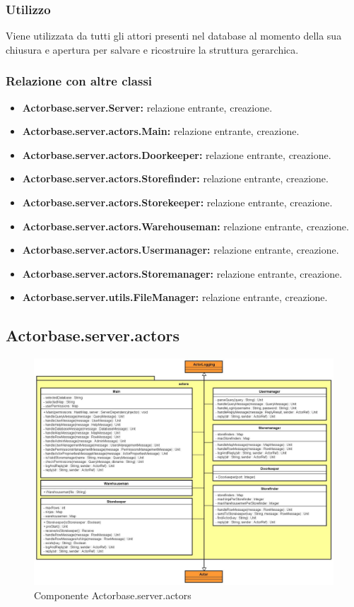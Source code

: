 \documentclass[a4paper]{article}
\begin{document}
			\subsubsection{Utilizzo}
				Viene utilizzata da tutti gli attori presenti nel database al momento della sua chiusura e apertura per salvare e ricostruire 
				la struttura gerarchica.
				
			\subsubsection{Relazione con altre classi}
				\begin{itemize}
					\item \textbf{Actorbase.server.Server:} relazione entrante, creazione.
					\item \textbf{Actorbase.server.actors.Main:} relazione entrante, creazione.
					\item \textbf{Actorbase.server.actors.Doorkeeper:} relazione entrante, creazione.
					\item \textbf{Actorbase.server.actors.Storefinder:} relazione entrante, creazione.
					\item \textbf{Actorbase.server.actors.Storekeeper:} relazione entrante, creazione.
					\item \textbf{Actorbase.server.actors.Warehouseman:} relazione entrante, creazione.
					\item \textbf{Actorbase.server.actors.Usermanager:} relazione entrante, creazione.
					\item \textbf{Actorbase.server.actors.Storemanager:} relazione entrante, creazione.
					\item \textbf{Actorbase.server.utils.FileManager:} relazione entrante, creazione.
				\end{itemize}
				
		\subsection{Actorbase.server.actors}
		
			\begin{figure} [H]
				\centering
				\includegraphics[width=\textwidth]{ST/Server/actorsLevel.jpg}
				\caption{Componente Actorbase.server.actors}
			\end{figure}
			
\end{document}
